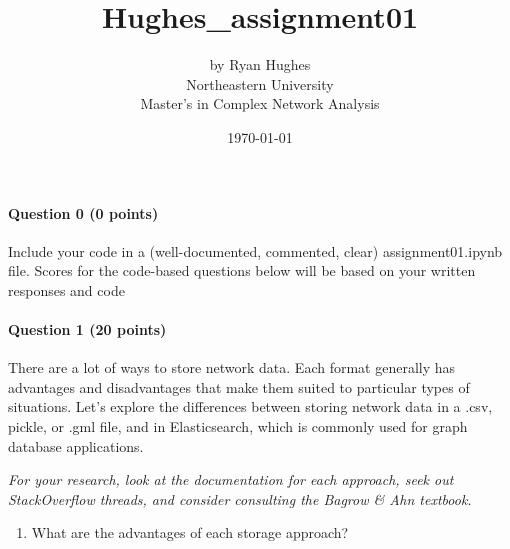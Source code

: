 \documentclass[11pt]{article}
\title{Hughes\_assignment01}
\author{by Ryan Hughes\\ Northeastern University\\ Master's in Complex Network Analysis}
\date{\today}
\providecommand{\tightlist}{%
      \setlength{\itemsep}{0pt}\setlength{\parskip}{0pt}}
\begin{document}
    
    \maketitle
    
    

    
    \paragraph{Question 0 (0 points)}\label{question-0-0-points}

Include your code in a (well-documented, commented, clear)
assignment01.ipynb file. Scores for the code-based questions below will
be based on your written responses and code

    \paragraph{Question 1 (20 points)}\label{question-1-20-points}

There are a lot of ways to store network data. Each format generally has
advantages and disadvantages that make them suited to particular types
of situations. Let's explore the differences between storing network
data in a .csv, pickle, or .gml file, and in Elasticsearch, which is
commonly used for graph database applications.

\emph{For your research, look at the documentation for each approach,
seek out StackOverflow threads, and consider consulting the Bagrow \&
Ahn textbook.}

    \begin{enumerate}
\def\labelenumi{(\alph{enumi})}
\tightlist
\item
  What are the advantages of each storage approach?
\end{enumerate}
\end{document}
